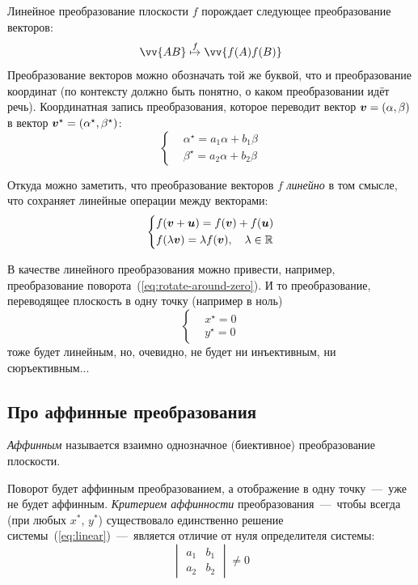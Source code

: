 \documentclass[a4paper,12pt]{article}
\begin{document}
  Линейное преобразование плоскости $f$ порождает следующее преобразование векторов:
  \[
    \vv{AB} \overset{f}{\mapsto} \vv{f(A)f(B)}
  \]
  Преобразование векторов можно обозначать той же буквой, что и преобразование координат (по контексту должно быть понятно, о каком преобразовании идёт речь).
  Координатная запись преобразования, которое переводит вектор $\bds v \hm= (\alpha, \beta)$ в вектор $\bds v^\star \hm= (\alpha^\star, \beta^\star)$:
  \begin{equation}
    \left\{
      \begin{aligned}
          &\alpha^\star = a_1 \alpha + b_1 \beta\\
          &\beta^\star = a_2 \alpha + b_2 \beta
      \end{aligned}
    \right.
  \end{equation}
  
  Откуда можно заметить, что преобразование векторов $f$ \emph{линейно} в том смысле, что сохраняет линейные операции между векторами:
  \[
    \left\{
      \begin{aligned}
        &f(\boldsymbol v + \boldsymbol u) = f(\boldsymbol v) + f(\boldsymbol u)\\
        &f(\lambda \boldsymbol v) = \lambda f(\boldsymbol v),\quad \lambda \in \operatorname{\mathbb R}
      \end{aligned}
    \right.
  \]
  
  В качестве линейного преобразования можно привести, например, преобразование поворота~(\ref{eq:rotate-around-zero}).
  И то преобразование, переводящее плоскость в одну точку (например в ноль)
  \[
    \left\{
      \begin{aligned}
        &x^\star = 0\\
        &y^\star = 0
      \end{aligned}
    \right.
  \]
  тоже будет линейным, но, очевидно, не будет ни инъективным, ни сюръективным...
  
  
  \subsection{Про аффинные преобразования}
  
  \begin{definition}
    \emph{Аффинным} называется взаимно однозначное (биективное) преобразование плоскости.
  \end{definition}
  
  
  Поворот будет аффинным преобразованием, а отображение в одну точку~---~уже не будет аффинным.
  \emph{Критерием аффинности} преобразования~---~чтобы всегда (при любых $x^*$, $y^*$) существовало единственно решение системы~(\ref{eq:linear})~---~является отличие от нуля определителя системы:
  \[
    \boxed{
      \begin{vmatrix} a_1 & b_1\\ a_2 & b_2\end{vmatrix} \not= 0
    }
  \]
  
\end{document}
